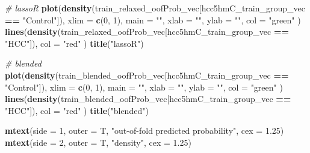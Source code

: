 \documentclass[
]{book}
\newenvironment{Shaded}{\begin{snugshade}}{\end{snugshade}}
\newcommand{\CommentTok}[1]{\textcolor[rgb]{0.56,0.35,0.01}{\textit{#1}}}
\newcommand{\DataTypeTok}[1]{\textcolor[rgb]{0.13,0.29,0.53}{#1}}
\newcommand{\DecValTok}[1]{\textcolor[rgb]{0.00,0.00,0.81}{#1}}
\newcommand{\FloatTok}[1]{\textcolor[rgb]{0.00,0.00,0.81}{#1}}
\newcommand{\KeywordTok}[1]{\textcolor[rgb]{0.13,0.29,0.53}{\textbf{#1}}}
\newcommand{\NormalTok}[1]{#1}
\newcommand{\OperatorTok}[1]{\textcolor[rgb]{0.81,0.36,0.00}{\textbf{#1}}}
\newcommand{\StringTok}[1]{\textcolor[rgb]{0.31,0.60,0.02}{#1}}
\begin{document}
\begin{Shaded}
\begin{Highlighting}[]
\CommentTok{\# lassoR}
\KeywordTok{plot}\NormalTok{(}\KeywordTok{density}\NormalTok{(train\_relaxed\_oofProb\_vec[hcc5hmC\_train\_group\_vec }\OperatorTok{==}\StringTok{ "Control"}\NormalTok{]),}
  \DataTypeTok{xlim =} \KeywordTok{c}\NormalTok{(}\DecValTok{0}\NormalTok{, }\DecValTok{1}\NormalTok{), }\DataTypeTok{main =} \StringTok{""}\NormalTok{, }\DataTypeTok{xlab =} \StringTok{""}\NormalTok{, }\DataTypeTok{ylab =} \StringTok{""}\NormalTok{, }\DataTypeTok{col =} \StringTok{"green"}
\NormalTok{)}
\KeywordTok{lines}\NormalTok{(}\KeywordTok{density}\NormalTok{(train\_relaxed\_oofProb\_vec[hcc5hmC\_train\_group\_vec }\OperatorTok{==}\StringTok{ "HCC"}\NormalTok{]),}
  \DataTypeTok{col =} \StringTok{"red"}
\NormalTok{)}
\KeywordTok{title}\NormalTok{(}\StringTok{"lassoR"}\NormalTok{)}

\CommentTok{\# blended}
\KeywordTok{plot}\NormalTok{(}\KeywordTok{density}\NormalTok{(train\_blended\_oofProb\_vec[hcc5hmC\_train\_group\_vec }\OperatorTok{==}\StringTok{ "Control"}\NormalTok{]),}
  \DataTypeTok{xlim =} \KeywordTok{c}\NormalTok{(}\DecValTok{0}\NormalTok{, }\DecValTok{1}\NormalTok{), }\DataTypeTok{main =} \StringTok{""}\NormalTok{, }\DataTypeTok{xlab =} \StringTok{""}\NormalTok{, }\DataTypeTok{ylab =} \StringTok{""}\NormalTok{, }\DataTypeTok{col =} \StringTok{"green"}
\NormalTok{)}
\KeywordTok{lines}\NormalTok{(}\KeywordTok{density}\NormalTok{(train\_blended\_oofProb\_vec[hcc5hmC\_train\_group\_vec }\OperatorTok{==}\StringTok{ "HCC"}\NormalTok{]),}
  \DataTypeTok{col =} \StringTok{"red"}
\NormalTok{)}
\KeywordTok{title}\NormalTok{(}\StringTok{"blended"}\NormalTok{)}

\KeywordTok{mtext}\NormalTok{(}\DataTypeTok{side =} \DecValTok{1}\NormalTok{, }\DataTypeTok{outer =}\NormalTok{ T, }\StringTok{"out{-}of{-}fold predicted probability"}\NormalTok{, }\DataTypeTok{cex =} \FloatTok{1.25}\NormalTok{)}
\KeywordTok{mtext}\NormalTok{(}\DataTypeTok{side =} \DecValTok{2}\NormalTok{, }\DataTypeTok{outer =}\NormalTok{ T, }\StringTok{"density"}\NormalTok{, }\DataTypeTok{cex =} \FloatTok{1.25}\NormalTok{)}
\end{Highlighting}
\end{Shaded}
\end{document}
